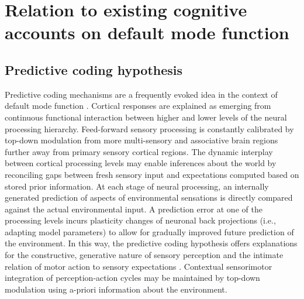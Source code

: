 \documentclass[10pt,letterpaper]{article}
\begin{document}
\section{Relation to existing cognitive accounts on default mode function}
\subsection{Predictive coding hypothesis}
Predictive coding mechanisms
\citep{clark2013whatever, friston2008hierarchical}
are a frequently evoked idea in the context of default mode function
\citep{bar2007}.
Cortical responses are explained as
emerging from continuous functional interaction between
higher and lower levels of the neural processing hierarchy.
Feed-forward sensory processing is constantly calibrated by
top-down modulation from more multi-sensory and associative brain regions
further away from primary sensory cortical regions.
The dynamic interplay between cortical processing levels
may enable inferences about the world by reconciling
gaps between fresh sensory input and expectations computed
based on stored prior information.
At each stage of neural processing,
an internally generated prediction of aspects of environmental sensations is
directly compared against the actual environmental input.
A prediction error at one of the processing levels
incurs plasticity changes of neuronal back projections
(i.e., adapting model parameters)
to allow for gradually improved future prediction of the environment.
In this way,
the predictive coding hypothesis offers explanations for
the constructive, generative nature of sensory perception
\citep{friston2010free} and
the intimate relation of motor action to sensory expectations
\citep{wolpert1995internal, kording2004bayesian}.
Contextual sensorimotor integration of perception-action cycles
may be maintained by top-down modulation
using a-priori information about the environment.
\end{document}
